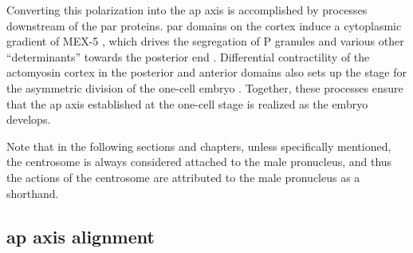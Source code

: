 Converting this polarization into the \ac{ap} axis is accomplished by processes downstream of the \ac{par} proteins. \ac{par} domains on the cortex induce a cytoplasmic gradient of MEX-5 \citep{schubert2000mex}, which drives the segregation of P granules and various other \enquote{determinants}  towards the posterior end \citep{hoege2013principles}. Differential contractility of the actomyosin cortex in the posterior and anterior domains also sets up the stage for the asymmetric division of the one-cell embryo \citep{grill2003distribution}. Together, these processes ensure that the \ac{ap} axis established at the one-cell stage is realized as the embryo develops.

Note that in the following sections and chapters, unless specifically mentioned, the centrosome is always considered attached to the male pronucleus, and thus the actions of the centrosome are attributed to the male pronucleus as a shorthand.

\subsection{\acs{ap} axis alignment}\label{subsec:ApAxisAlignment}

